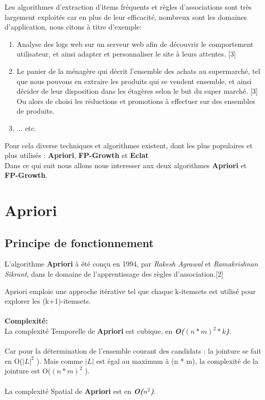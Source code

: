 \documentclass[12pt,a4paper,oneside]{book}
\begin{document}
	Les algorithmes d'extraction d'items fréquents et règles d'associations sont très largement exploités car en plus de leur efficacité, nombreux sont les domaines d'application, nous citons à titre d'exemple:
	\begin{enumerate}
		
		
		\item Analyse des logs web sur un serveur web afin de découvrir le comportement utilisateur, et ainsi adapter et personnaliser le site à leurs attentes. [3]
		
		\item Le panier de la ménagère qui décrit l'ensemble des achats au supermarché, tel que nous pouvons en extraire les produits qui se vendent ensemble, et ainsi décider de leur disposition dans les étagères selon le but du super marché. [3]\\
		
		Ou alors de choisi les réductions et promotions à effectuer sur des ensembles de produits.
		
		\item ... etc.
		
	\end{enumerate}
	
	Pour cela diverse techniques et algorithmes existent, dont les plus populaires et plus utilisés : \textbf{Apriori}, \textbf{FP-Growth} et \textbf{Eclat}\\
	Dans ce qui suit nous allons nous interesser aux deux algorithmes \textbf{Apriori} et \textbf{FP-Growth}.
	

	\section{Apriori}
	\subsection{Principe de fonctionnement}
	L'algorithme \textbf{Apriori} à été conçu en 1994, par \textit{Rakesh Agrawal} et \textit{Ramakrishnan Sikrant}, dans le domaine de l'apprentissage des règles d'association.[2]
	
	Apriori emploie une approche itérative  tel que chaque k-itemsets est utilisé pour explorer les (k+1)-itemsets.\\
	\textbf{ }\\
	\textbf{Complexité:}\\
	La complexité Temporelle de \textbf{Apriori} est cubique,  en \textbf{\textit{O($(n * m)^2 * k$)}}.\\
\textbf{ }\\
Car pour la détermination de l'ensemble courant des candidats : la jointure se fait en O($|L|^2$ ). Mais comme $|L|$ est égal au maximum à (n * m), la complexité de la jointure est O($(n * m)^2$ ).\\
\textbf{ }\\	
La complexité Spatial  de \textbf{Apriori} est en \textbf{\textit{O($n^2$)}}.\\
	
\end{document}
